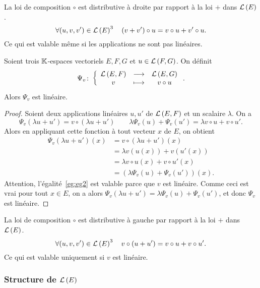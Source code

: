 \begin{cor}
  La loi de composition \(\circ\) est distributive à droite par rapport à la loi \(+\) dans \(\mathcal{L}\left(E\right)\).
  \begin{equation}
    \forall (u,v,v') \in \mathcal{L}\left(E\right)^3 \quad (v+v') \circ u = v \circ u + v' \circ u.
  \end{equation}
  Ce qui est valable même si les applications ne sont pas linéaires.
\end{cor}

\begin{prop}
  Soient trois \(\mathbb{K}\)-espaces vectoriels \(E,F,G\) et \(u \in \mathcal{L}\left(F,G\right)\). On définit
  \begin{equation}
  	\Psi_v\colon \left\{\begin{array}{ccc} \mathcal{L}\left(E,F\right) & \longrightarrow &\mathcal{L}\left(E,G\right)\\ v & \longmapsto & v \circ u \end{array} \right..
  \end{equation} 
  Alors \(\Psi_v\) est linéaire.
\end{prop}
\begin{proof}
  Soient deux applications linéaires \(u,u'\) de \(\mathcal{L}\left(E,F\right)\) et un scalaire \(\lambda\). On a
  \begin{equation}
    \Psi_v(\lambda u+u')=v \circ (\lambda u+u') \qquad \lambda \Psi_v(u)+\Psi_v(u')=\lambda v \circ u + v \circ u'.
  \end{equation}
  Alors en appliquant cette fonction à tout vecteur \(x\) de \(E\), on obtient
  \begin{align}
    \Psi_v(\lambda u+u')(x)&=v \circ (\lambda u+u')(x) \\
    &=\lambda v(u(x)) + v(u'(x)) \label{eg:eg2}\\
    &=\lambda v\circ u(x) +v\circ u'(x) \\
    &=(\lambda \Psi_v(u)+\Psi_v(u'))(x).
  \end{align}
  Attention, l'égalité~\eqref{eg:eg2} est valable parce que \(v\) est linéaire. Comme ceci est vrai pour tout \(x \in E\), on a alors \(\Psi_v(\lambda u+u')=\lambda \Psi_v(u)+\Psi_v(u')\), et donc \(\Psi_v\) est linéaire.
\end{proof}
\begin{cor}
  La loi de composition \(\circ\) est distributive à gauche par rapport à la loi \(+\) dans \(\mathcal{L}\left(E\right)\).
  \begin{equation}
    \forall (u,v,v') \in \mathcal{L}\left(E\right)^3 \quad v \circ (u+u') = v \circ u + v \circ u'.
  \end{equation}
  Ce qui est valable uniquement si \(v\) est linéaire.
\end{cor}

\subsubsection{Structure de \(\mathcal{L}\left(E\right)\)}

